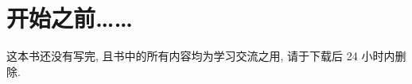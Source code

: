 \documentclass[UTF8,10pt]{ctexbook} %
\begin{document}







\newpage
\thispagestyle{empty}

\pagestyle{plain}

\tableofcontents
\newpage
\thispagestyle{empty}

\makeatletter
\let\ps@plain\ps@empty
\makeatother



\chapter*{开始之前……}

这本书还没有写完, 且书中的所有内容均为学习交流之用, 请于下载后 24 小时内删除.

\cleardoublepage %
\pagestyle{fancy}
\setcounter{page}{1} %


\end{document}

